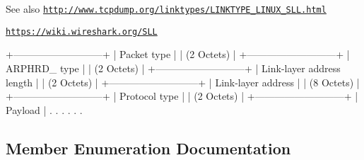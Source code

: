 \begin{DoxySeeAlso}{See also}
\href{http://www.tcpdump.org/linktypes/LINKTYPE_LINUX_SLL.html}{\tt http\+://www.\+tcpdump.\+org/linktypes/\+L\+I\+N\+K\+T\+Y\+P\+E\+\_\+\+L\+I\+N\+U\+X\+\_\+\+S\+L\+L.\+html} 

\href{https://wiki.wireshark.org/SLL}{\tt https\+://wiki.\+wireshark.\+org/\+S\+LL}
\end{DoxySeeAlso}
\begin{DoxyVerb}  +---------------------------+
  |         Packet type       |
  |         (2 Octets)        |
  +---------------------------+
  |        ARPHRD_ type       |
  |         (2 Octets)        |
  +---------------------------+
  | Link-layer address length |
  |         (2 Octets)        |
  +---------------------------+
  |    Link-layer address     |
  |         (8 Octets)        |
  +---------------------------+
  |        Protocol type      |
  |         (2 Octets)        |
  +---------------------------+
  |           Payload         |
  .                           .
  .                           .
  .                           .\end{DoxyVerb}
 

\subsection{Member Enumeration Documentation}
